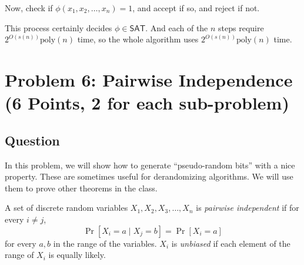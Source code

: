 \documentclass{article}
\def \poly{\text{poly}}
\begin{document}
Now, check if $\phi(x_1, x_2, \dots, x_n) = 1$, and accept if so, and reject if not.

This process certainly decides $\phi \in \mathsf{SAT}$.
And each of the $n$ steps require $2^{O(s(n))} \poly(n)$ time, so the whole algorithm uses $2^{O(s(n))} \poly(n)$ time.

\newpage
\section*{Problem 6: Pairwise Independence (6 Points, 2 for each sub-problem)}  

\subsection*{Question}
In this problem, we will show how to generate ``pseudo-random bits'' with a nice property. These are sometimes useful for derandomizing algorithms. We will use them to prove other theorems in the class.

A set of discrete random variables $X_1, X_2, X_3, \ldots, X_n$ is {\em pairwise independent} if for every $i \neq j$,
\[\Pr[ X_i = a \mid X_j = b ] = \Pr[ X_i = a]\] for every $a,b$ in the range of the variables.
$X_i$ is {\em unbiased} if each element of the range of $X_i$ is equally likely.
\end{document}
